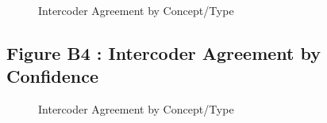 \documentclass{article}
\begin{document}
\begin{figure}[H]
\caption{Intercoder Agreement by Concept/Type \label{fig:intercoderagreement}}
\end{figure}
\clearpage

\hypertarget{app:agreement_by_confidence}{%
\subsection{Figure B4 : Intercoder Agreement by
Confidence}\label{app:agreement_by_confidence}}

\hphantom{em}

\begin{figure}[H]
\caption{Intercoder Agreement by Concept/Type \label{fig:intercoderagreement_confidence}}
\end{figure}
\clearpage
\end{document}
